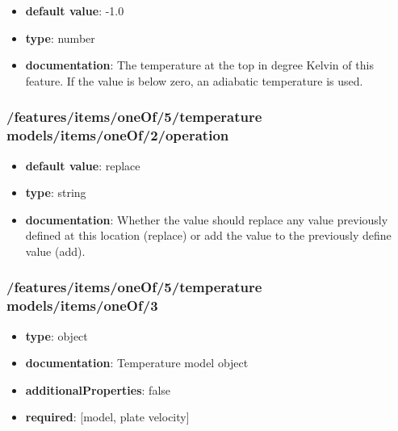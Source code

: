 \begin{itemize}\item {\bf default value}: -1.0
\item {\bf type}: number
\item {\bf documentation}: The temperature at the top in degree Kelvin of this feature. If the value is below zero, an adiabatic temperature is used.
\end{itemize}\subsubsection{/features/items/oneOf/5/temperature models/items/oneOf/2/operation}
\begin{itemize}\item {\bf default value}: replace
\item {\bf type}: string
\item {\bf documentation}: Whether the value should replace any value previously defined at this location (replace) or add the value to the previously define value (add).
\end{itemize}\subsubsection{/features/items/oneOf/5/temperature models/items/oneOf/3}
\begin{itemize}\item {\bf type}: object
\item {\bf documentation}: Temperature model object
\item {\bf additionalProperties}: false
\item {\bf required}: [model, plate velocity]\end{itemize}
